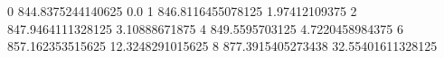 0 844.8375244140625 0.0
1 846.8116455078125 1.97412109375
2 847.9464111328125 3.10888671875
4 849.5595703125 4.7220458984375
6 857.162353515625 12.3248291015625
8 877.3915405273438 32.55401611328125
